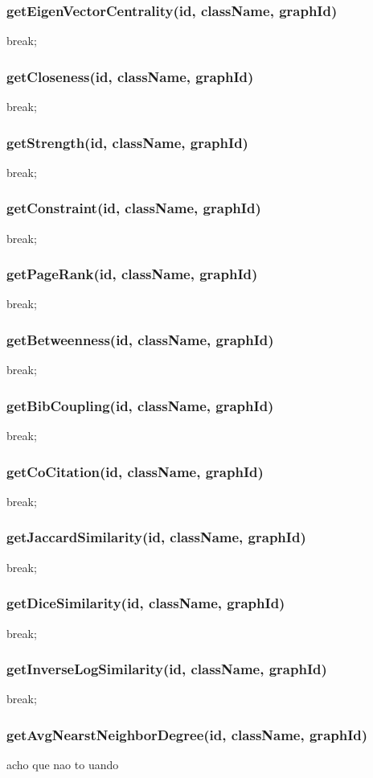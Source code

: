 \subsubsection{getEigenVectorCentrality(id, className, graphId)}
break;
\subsubsection{getCloseness(id, className, graphId)}
break;
\subsubsection{getStrength(id, className, graphId)}
break;
\subsubsection{getConstraint(id, className, graphId)}
break;
\subsubsection{getPageRank(id, className, graphId)}
break;
\subsubsection{getBetweenness(id, className, graphId)}
break;
\subsubsection{getBibCoupling(id, className, graphId)}
break;
\subsubsection{getCoCitation(id, className, graphId)}
break;
\subsubsection{getJaccardSimilarity(id, className, graphId)}
break;
\subsubsection{getDiceSimilarity(id, className, graphId)}
break;
\subsubsection{getInverseLogSimilarity(id, className, graphId)}
break;
\subsubsection{getAvgNearstNeighborDegree(id, className, graphId)}
acho que nao to uando

